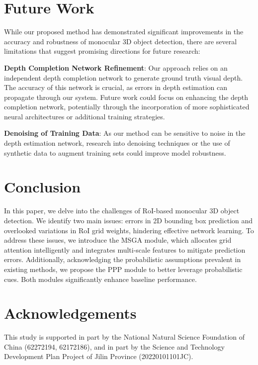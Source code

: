 \documentclass[journal]{IEEEtran}
\begin{document}
	\section{Future Work}\label{future work}
	While our proposed method has demonstrated significant improvements in the accuracy and robustness of monocular 3D object detection, there are several limitations that suggest promising directions for future research:
	
	\textbf{Depth Completion Network Refinement}: Our approach relies on an independent depth completion network to generate ground truth visual depth. The accuracy of this network is crucial, as errors in depth estimation can propagate through our system. Future work could focus on enhancing the depth completion network, potentially through the incorporation of more sophisticated neural architectures or additional training strategies.
		
	\textbf{Denoising of Training Data}: As our method can be sensitive to noise in the depth estimation network, research into denoising techniques or the use of synthetic data to augment training sets could improve model robustness.
	
	\section{Conclusion}\label{conclusion}
	In this paper, we delve into the challenges of RoI-based monocular 3D object detection. We identify two main issues: errors in 2D bounding box prediction and overlooked variations in RoI grid weights, hindering effective network learning. To address these issues, we introduce the MSGA module, which allocates grid attention intelligently and integrates multi-scale features to mitigate prediction errors. Additionally, acknowledging the probabilistic assumptions prevalent in existing methods, we propose the PPP module to better leverage probabilistic cues. Both modules significantly enhance baseline performance.
	
	\section{Acknowledgements}
	This study is supported in part by the National Natural Science Foundation of China (62272194, 62172186), and in part by the Science and Technology Development Plan Project of Jilin Province (20220101101JC). 
	
\end{document}

